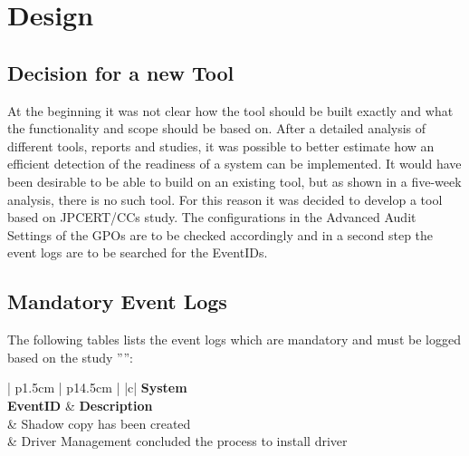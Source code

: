 \section{Design}
\subsection{Decision for a new Tool}
At the beginning it was not clear how the tool should be built exactly and what the functionality and scope should be based on. After a detailed analysis of different tools, reports and studies, it was possible to better estimate how an efficient detection of the readiness of a system can be implemented. It would have been desirable to be able to build on an existing tool, but as shown in a five-week analysis, there is no such tool. For this reason it was decided to develop a tool based on JPCERT/CCs study. The configurations in the Advanced Audit Settings of the GPOs are to be checked accordingly and in a second step the event logs are to be searched for the EventIDs.

\subsection{Mandatory Event Logs}\label{MandatoryLogs}
The following tables lists the event logs which are mandatory and must be logged based on the study '''':
\
\vspace{0.5cm}
\begin{table}[H]
    \centering
    \begin{tabular}{| p{1.5cm} | p{14.5cm} |} \hline
         {|c|} {\tiny\bfseries System} \\ \hline
        \textbf{EventID} & \textbf{Description}  \\ \footnotemark[2] & Shadow copy has been created \\ \hline
        20001\footnotemark[2] & Driver Management concluded the process to install driver  \\ \hline
    \end{tabular}
    \caption{Mandatory System Event Logs}
\end{table}


